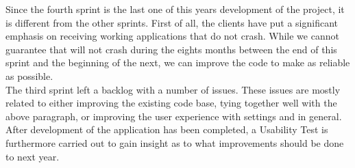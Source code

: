 Since the fourth sprint is the last one of this years development of the project, it is different from the other sprints.
First of all, the clients have put a significant emphasis on receiving working applications that do not crash.
While we cannot guarantee that \launcher will not crash during the eights months between the end of this sprint and the beginning of the next, we can improve the code to make \launcher as reliable as possible.\\

The third sprint left a backlog with a number of issues.
These issues are mostly related to either improving the existing code base, tying together well with the above paragraph, or improving the user experience with settings and \launcher in general.\\

After development of the application has been completed, a Usability Test is furthermore carried out to gain insight as to what improvements should be done to \launcher next year.